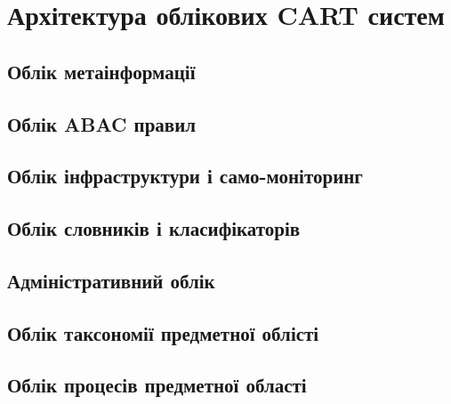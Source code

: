 \section{Архітектура облікових CART систем}

\subsection{Облік метаінформації}

\subsection{Облік ABAC правил}

\subsection{Облік інфраструктури і само-моніторинг}

\subsection{Облік словників і класифікаторів}

\subsection{Адміністративний облік}

\subsection{Облік таксономії предметної облісті}

\subsection{Облік процесів предметної області}

